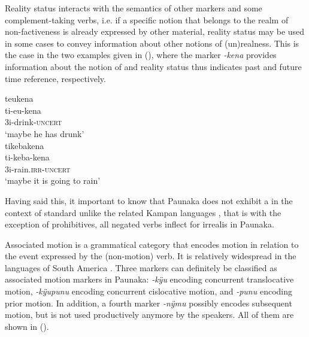 Reality status interacts with the semantics of other markers and some com\-ple\-ment-taking verbs, i.e. if a specific notion that belongs to the realm of non-factiveness is already expressed by other material, reality status may be used in some cases to convey information about other notions of (un)realness. This is the case in the two examples given in (), where the  marker \textit{-kena} provides information about the notion of  and reality status thus indicates past and future time reference, respectively.

\ea\label{ex:Sketch-kena-RS}
  \ea
\begingl
\glpreamble teukena\\
\gla ti-eu-kena\\
\glb 3i-drink-\textsc{uncert}\\
\glft ‘maybe he has drunk’\\
\endgl
  \ex
\begingl
\glpreamble tikebakena\\
\gla ti-keba-kena\\
\glb 3i-rain.\textsc{irr}-\textsc{uncert}\\
\glft ‘maybe it is going to rain’\\
\endgl
\z
\xe

Having said this, it important to know that Paunaka does not exhibit a  in the context of standard  unlike the related Kampan languages \citep[cf.][]{Michael2014,Michael2014a}, that is with the exception of prohibitives, all negated verbs inflect for irrealis in Paunaka.

Associated motion is a grammatical category that encodes motion in relation to the event expressed by the (non-motion) verb. It is relatively widespread in the languages of South America \citep[cf.][]{Guillaume2016}. Three markers can definitely be classified as associated motion markers in Paunaka: \textit{-kÿu} encoding concurrent translocative motion, \textit{-kÿupunu} encoding concurrent cislocative motion, and \textit{-punu} encoding prior motion. In addition, a fourth marker \textit{-nÿmu} possibly encodes subsequent motion, but is not used productively anymore by the speakers. All of them are shown in ().

